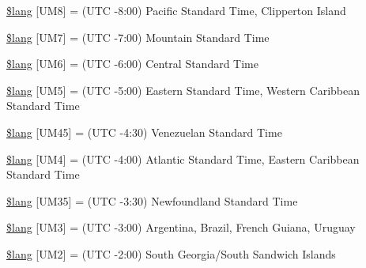 \begin{DoxyCompactItemize}
\item 
\hyperlink{_admin_2system_2language_2english_2date__lang_8php_ab3ed4c273fcb61197ef7d8e4bae07415}{\$lang} \mbox{[}\textquotesingle{}U\+M8\textquotesingle{}\mbox{]} = \textquotesingle{}(U\+T\+C -\/8\+:00) Pacific Standard Time, Clipperton Island\textquotesingle{}
\item 
\hyperlink{_admin_2system_2language_2english_2date__lang_8php_aa642f12cf461f915682b17c0c30b2475}{\$lang} \mbox{[}\textquotesingle{}U\+M7\textquotesingle{}\mbox{]} = \textquotesingle{}(U\+T\+C -\/7\+:00) Mountain Standard Time\textquotesingle{}
\item 
\hyperlink{_admin_2system_2language_2english_2date__lang_8php_a30f39dd7748d488f4a0140751336d257}{\$lang} \mbox{[}\textquotesingle{}U\+M6\textquotesingle{}\mbox{]} = \textquotesingle{}(U\+T\+C -\/6\+:00) Central Standard Time\textquotesingle{}
\item 
\hyperlink{_admin_2system_2language_2english_2date__lang_8php_a557150a51633e11dc49e3bfd2e1c091e}{\$lang} \mbox{[}\textquotesingle{}U\+M5\textquotesingle{}\mbox{]} = \textquotesingle{}(U\+T\+C -\/5\+:00) Eastern Standard Time, Western Caribbean Standard Time\textquotesingle{}
\item 
\hyperlink{_admin_2system_2language_2english_2date__lang_8php_aac9f8a1e0da4b3cee00a19fe9ac642d0}{\$lang} \mbox{[}\textquotesingle{}U\+M45\textquotesingle{}\mbox{]} = \textquotesingle{}(U\+T\+C -\/4\+:30) Venezuelan Standard Time\textquotesingle{}
\item 
\hyperlink{_admin_2system_2language_2english_2date__lang_8php_a42f66872f4a082bcb2ee004bd2716828}{\$lang} \mbox{[}\textquotesingle{}U\+M4\textquotesingle{}\mbox{]} = \textquotesingle{}(U\+T\+C -\/4\+:00) Atlantic Standard Time, Eastern Caribbean Standard Time\textquotesingle{}
\item 
\hyperlink{_admin_2system_2language_2english_2date__lang_8php_a389c4a60af83efd29503f60033f3071d}{\$lang} \mbox{[}\textquotesingle{}U\+M35\textquotesingle{}\mbox{]} = \textquotesingle{}(U\+T\+C -\/3\+:30) Newfoundland Standard Time\textquotesingle{}
\item 
\hyperlink{_admin_2system_2language_2english_2date__lang_8php_abd67512895187d494bbfb18f8d8fee43}{\$lang} \mbox{[}\textquotesingle{}U\+M3\textquotesingle{}\mbox{]} = \textquotesingle{}(U\+T\+C -\/3\+:00) Argentina, Brazil, French Guiana, Uruguay\textquotesingle{}
\item 
\hyperlink{_admin_2system_2language_2english_2date__lang_8php_a8ee2f132b462bb709fc3402a592ff573}{\$lang} \mbox{[}\textquotesingle{}U\+M2\textquotesingle{}\mbox{]} = \textquotesingle{}(U\+T\+C -\/2\+:00) South Georgia/South Sandwich Islands\textquotesingle{}

\end{DoxyCompactItemize}
